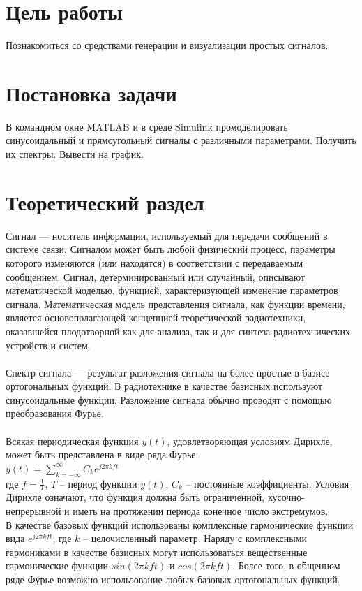 \documentclass[a4paper]{article}
\begin{document}
\vfill %

\section{Цель работы}
Познакомиться со средствами генерации и визуализации простых сигналов.

\section{Постановка задачи}
В командном окне MATLAB и в среде Simulink промоделировать синусоидальный и прямоугольный сигналы с различными параметрами. Получить их спектры. Вывести на график.

\section{Теоретический раздел}
Сигнал — носитель информации, используемый для передачи сообщений в системе связи. Сигналом может быть любой физический процесс, параметры которого изменяются (или находятся) в соответствии с передаваемым сообщением. Сигнал, детерминированный или случайный, описывают математической моделью, функцией, характеризующей изменение параметров сигнала. Математическая модель представления сигнала, как функции времени, является основополагающей концепцией теоретической радиотехники, оказавшейся плодотворной как для анализа, так и для синтеза радиотехнических устройств и систем.\\\\
Спектр сигнала — результат разложения сигнала на более простые в базисе ортогональных функций. В радиотехнике в качестве базисных используют синусоидальные функции. Разложение сигнала обычно проводят с помощью преобразования Фурье.\\\\
Всякая периодическая функция $y(t)$, удовлетворяющая условиям Дирихле, может быть представлена в виде ряда Фурье:\\

$y(t) = \sum_{k=-\infty}^{\infty}C_ke^{j2{\pi}kft}$\\

где $f = \frac{1}{T}$, $T$ -- период функции $y(t)$, $C_k$ -- постоянные коэффициенты. Условия Дирихле означают, что функция должна быть ограниченной, кусочно-непрерывной и иметь на протяжении периода конечное число экстремумов.\\

В качестве базовых функций использованы комплексные гармонические функции вида $e^{j2{\pi}kft}$, где $k$ -- целочисленный параметр. Наряду с комплексными гармониками в качестве базисных могут использоваться вещественные гармонические функции $sin(2{\pi}kft)$ и $cos(2{\pi}kft)$. Более того, в общенном ряде Фурье возможно использование любых базовых ортогональных функций.\\
\end{document}
